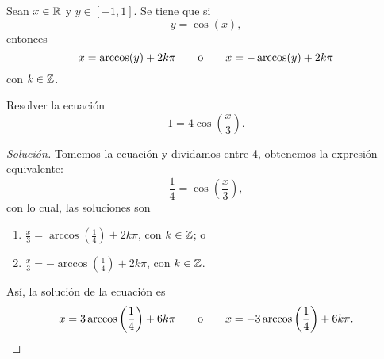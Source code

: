 \documentclass[a4,12pt]{aleph-notas}
\begin{document}
\begin{teo}
    Sean $x\in \mathbb{R}$ y $y\in [-1,1]$. Se tiene que si
    \[
        y =\cos(x),
    \]
    entonces
    \[
        x = \arccos(y) + 2k\pi
        \qquad\text{o}\qquad
        x = -\arccos(y) + 2k\pi
    \]
    con $k\in\mathbb{Z}$.
\end{teo}

\begin{ejer}
    Resolver la ecuación
    \[
        1=4\cos\left(\frac{x}{3}\right).
    \]
\end{ejer}

\begin{proof}[Solución]
    Tomemos la ecuación y dividamos entre 4, obtenemos la expresión equivalente:
    \[
        \frac{1}{4}=\cos\left(\frac{x}{3}\right),
    \]
    con lo cual, las soluciones son
    \begin{enumerate}[label=\textit{\alph*)}]
        \item\label{ej01:c01} $\displaystyle \frac{x}{3}=\arccos\left(\frac{1}{4}\right)+2k\pi$, con $k\in\mathbb{Z}$; o
        \item\label{ej01:c02} $\displaystyle \frac{x}{3}=-\arccos\left(\frac{1}{4}\right)+2k\pi$, con $k\in\mathbb{Z}$.
    \end{enumerate}
    Así, la solución de la ecuación es
    \[
        x=3\arccos\left(\frac{1}{4}\right)+6k\pi
        \qquad\text{o}\qquad
        x=-3\arccos\left(\frac{1}{4}\right)+6k\pi.\qedhere
    \]
\end{proof}
\end{document}
